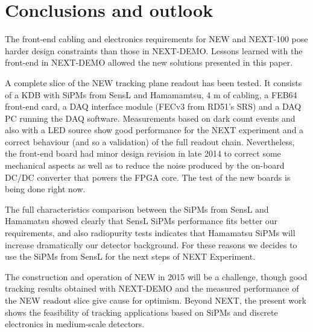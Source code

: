 \section{Conclusions and outlook}
The front-end cabling and electronics requirements for NEW and NEXT-100 pose harder design constraints than those in NEXT-DEMO. Lessons learned with the front-end in NEXT-DEMO allowed the new solutions presented in this paper.

A complete slice of the NEW tracking plane readout has been tested. It consists of a KDB with SiPMs from SensL and Hamamamtsu, 4 m of cabling, a FEB64 front-end card, a DAQ interface module (FECv3 from RD51's SRS) and a DAQ PC running the DAQ software. 
Measurements based on dark count events and also with a LED source show good performance for the NEXT experiment and a correct behaviour (and so a validation) 
of the full readout chain. Nevertheless, the front-end board had minor design revision in late 2014 to correct some mechanical aspects as well as to reduce the noise produced by the on-board DC/DC converter that powers the FPGA core. The test of the new boards is being done right now.

The full characteristics comparison between the SiPMs from SensL and Hamamatsu showed clearly that SensL SiPMs performance fits better our requirements, and also radiopurity tests indicates that Hamamatsu SiPMs will increase dramatically our detector background. For these reasons we decides to use the SiPMs from SensL for the next steps of NEXT Experiment.

The construction and operation of NEW in 2015 will be a challenge, though good tracking results obtained with NEXT-DEMO and the measured performance of the NEW readout slice give cause for optimism. Beyond NEXT, the present work shows the feasibility of tracking applications based on SiPMs and discrete electronics in medium-scale detectors.